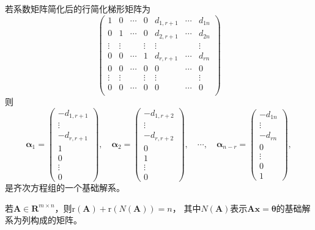 \begin{remark}
    若系数矩阵简化后的行简化梯形矩阵为
    $$\left(\begin{array}{ccccccc}
        1 & 0 & \cdots & 0 & d_{1,r+1} & \cdots & d_{1n} \\
        0 & 1 & \cdots & 0 & d_{2,r+1} & \cdots & d_{2n} \\
        \vdots & \vdots &  & \vdots & \vdots &  & \vdots \\
        0 & 0 & \cdots & 1 & d_{r,r+1} & \cdots & d_{rn} \\
        0 & 0 & \cdots & 0 & 0 & \cdots & 0 \\
        \vdots & \vdots &  & \vdots & \vdots &  & \vdots \\
        0 & 0 & \cdots & 0 & 0 & \cdots & 0 \\
    \end{array}\right)$$
    则
    $$\boldsymbol{\alpha}_1=\left(\begin{array}{c}
        -d_{1,r+1}\\
        \vdots\\
        -d_{r,r+1}\\
        1\\
        0\\
        \vdots\\
        0
    \end{array}\right),\quad
    \boldsymbol{\alpha}_2=\left(\begin{array}{c}
        -d_{1,r+2}\\
        \vdots\\
        -d_{r,r+2}\\
        0\\
        1\\
        \vdots\\
        0
    \end{array}\right),\quad
    \cdots,\quad
    \boldsymbol{\alpha}_{n-r}=\left(\begin{array}{c}
        -d_{1n}\\
        \vdots\\
        -d_{rn}\\
        0\\
        \vdots\\
        0\\
        1
    \end{array}\right),$$
    是齐次方程组的一个基础解系。
\end{remark}

\begin{theorem}
    若$\boldsymbol{A}\in \mathbf{R}^{m\times n}$，则$\mathrm{r}(\boldsymbol{A})+\mathrm{r}(N(\boldsymbol{A}))=n$，
    其中$N(\boldsymbol{A})$表示$\boldsymbol{A}\boldsymbol{x}=\boldsymbol{\theta}$的基础解系为列构成的矩阵。
\end{theorem}

